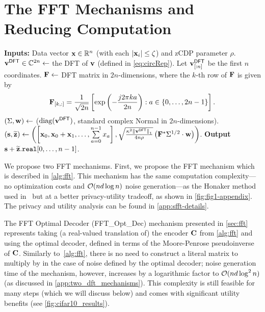 \documentclass{article} %
\theoremstyle{named}
\begin{document}
\section{The FFT Mechanisms and Reducing Computation}\label{app:ssec:comp-costs}
\begin{algorithm}[h]
\caption{DP-Prefix Sum Computation via FFT (with $\mdim = 1$)}

\begin{algorithmic}%
\STATE \textbf{Inputs:} Data vector $\mathbf{x}\in\mathbb{R}^{n}$ (with each $| \mathbf{x}_i | \leq \zeta$) and zCDP parameter $\rho$.
\STATE $\mathbf{v}^{\sf DFT}\in\mathbb{C}^{2n} \leftarrow $ the DFT of $\mathbf{v}$ (defined in \cref{eq:circRep}). Let $\mathbf{v}^{\sf DFT}_{[:n]}$ be the first $n$ coordinates.
\STATE $\mathbf{F}\leftarrow$ DFT matrix in $2n$-dimensions, where the $k$-th row of $\mathbf{F}$ is given by 
\[
\mathbf{F}_{[k, :]} = \frac{1}{\sqrt{2n}}\left[
  \exp\left(-\frac{j2\pi ka}{2n}\right):a\in\{0,\ldots,2n-1\}\right].
\] 
\STATE $(\Sigma, \mathbf{w})\leftarrow $ ($\operatorname{diag}(\mathbf{v}^{\sf DFT})$, standard complex Normal in $2n$-dimensions).
\STATE  $(\mathbf{s},\widetilde{\mathbf{z}})\leftarrow
   \left(\left[\mathbf{x}_0, \mathbf{x}_0 + \mathbf{x}_1,\ldots,\sum\limits_{a=0}^{n-1}x_a\right],
   \sqrt{\frac{\kappa^2\left\|\mathbf{v}^{\sf DFT}\right\|_1}{4n\rho}}\left(\mathbf{F}^*\Sigma^{1/2}\cdot\mathbf{w}\right)\right)$. 
\STATE \textbf{Output} $\mathbf{s}+\widetilde{\mathbf{z}}.\texttt{real}[0,\ldots,n-1]$.
\end{algorithmic}
\label{alg:fft}
\end{algorithm}
We propose two FFT mechanisms. First, we propose the FFT mechanism which is described in \cref{alg:fft}. This mechanism has the same computation complexity---no optimization costs and $\mathcal{O}(nd\log{\ensuremath{n}})$ noise generation---as the Honaker method used in~\citet{kairouz2021practical} but at a better privacy-utility tradeoff, as shown in \cref{fig:fig1-appendix}. The privacy and utility analysis can be found in \cref{app:sfft-details}.

The FFT Optimal Decoder (FFT\_Opt\_Dec) mechanism presented in \cref{sec:fft} represents taking (a real-valued translation of) the encoder $\mathbf{C}$ from \cref{alg:fft} and using the optimal decoder, defined in terms of the Moore-Penrose pseudoinverse of $\mathbf{C}$. Similarly to~\cref{alg:fft}, there is no need to construct a literal matrix to multiply by in the case of noise defined by the optimal decoder; noise generation time of the mechanism, however, increases by a logarithmic factor to $\mathcal{O}(nd\log^2{n})$ (as discussed in \cref{app:two_dft_mechanisms}). This complexity is still feasible for many steps (which we will discuss below) and comes with significant utility benefits (see \cref{fig:cifar10_results}).
\end{document}
